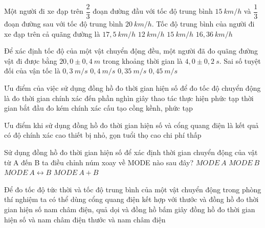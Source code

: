 \begin{ex}%
Một người đi xe đạp trên $\dfrac{2}{3}$ đoạn đường đầu với tốc độ trung bình $15\ km/h$ và $\dfrac{1}{3}$ đoạn đường sau với tốc độ trung bình $20\ km/h$. Tốc độ trung bình của người đi xe đạp trên cả quãng đường là
\choice
{$17,5\ km/h$}
{$12\ km/h$}
{$15\ km/h$}
{\True $16,36\ km/h$}
\end{ex}
\begin{ex}
Để xác định tốc độ của một vật chuyển động đều, một người đã đo quãng đường vật đi được bằng $20,0 \pm 0,4\ m$ trong khoảng thời gian là $4,0 \pm 0,2\ s$. Sai số tuyệt đối của vận tốc là
\choice
{$0,3\ m/s$}
{$0,4\ m/s$}
{\True $0,35\ m/s$}
{$0,45\ m/s$}
\loigiai{
}
\end{ex}
\begin{ex}%
Ưu điểm của việc sử dụng đồng hồ đo thời gian hiện số để đo tốc độ chuyển động là
\choice
{\True đo thời gian chính xác đến phần nghìn giây}
{thao tác thực hiện phức tạp}
{thời gian bắt đầu đo kém chính xác}
{cấu tạo cồng kềnh, phức tạp}

\loigiai{
}
 \end{ex}
\begin{ex}%
Ưu điểm khi sử dụng đồng hồ đo thời gian hiện số và cổng quang điện là
\choice
{\True kết quả có độ chính xác cao}
{thiết bị nhỏ, gọn}
{tuổi thọ cao}
{chi phí thấp}

\loigiai{
}
 \end{ex}
\begin{ex}%
Sử dụng đồng hồ đo thời gian hiện số để xác định thời gian chuyển động của vật từ A đến B ta điều chỉnh núm xoay về MODE nào sau đây?
\choice
{$MODE\ A$}
{$MODE\ B$}
{\True $MODE\ A \leftrightarrow B$}
{$MODE\ A+B$}
\loigiai{
}
 \end{ex}
\begin{ex}%
Để đo tốc độ tức thời và tốc độ trung bình của một vật chuyển động trong phòng thí nghiệm ta có thể dùng cổng quang điện kết hợp với
\choice
{\True thước và đồng hồ đo thời gian hiện số}
{nam châm điện, quả dọi và đồng hồ bấm giây}
{đồng hồ đo thời gian hiện số và nam châm điện}
{thước và nam châm điện}

\loigiai{
}
 \end{ex}
